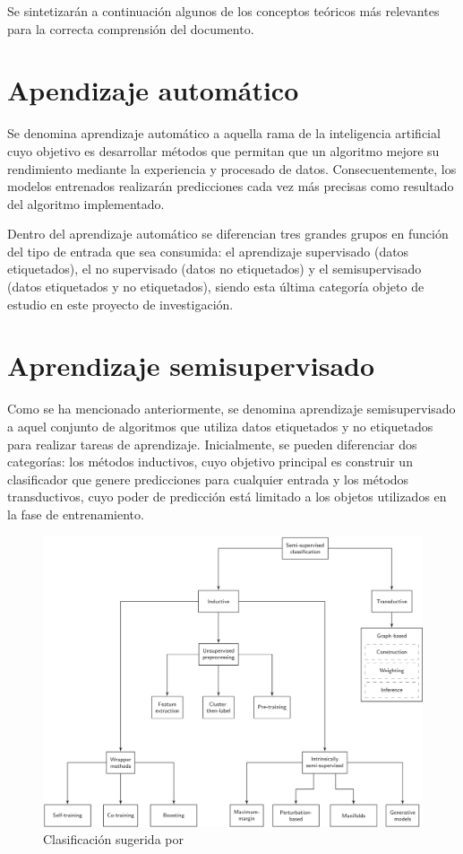 
Se sintetizarán a continuación algunos de los conceptos teóricos más relevantes para la correcta comprensión del documento.

\section{Apendizaje automático}

Se denomina aprendizaje automático a aquella rama de la inteligencia artificial cuyo objetivo es desarrollar métodos que permitan que un algoritmo mejore su rendimiento mediante la experiencia y procesado de datos. Consecuentemente, los modelos entrenados realizarán predicciones cada vez más precisas como resultado del algoritmo implementado.

Dentro del aprendizaje automático se diferencian tres grandes grupos en función del tipo de entrada que sea consumida: el aprendizaje supervisado (datos etiquetados), el no supervisado (datos no etiquetados) y el semisupervisado (datos etiquetados y no etiquetados), siendo esta última categoría objeto de estudio en este proyecto de investigación. 

\section{Aprendizaje semisupervisado}

Como se ha mencionado anteriormente, se denomina aprendizaje semisupervisado a aquel conjunto de algoritmos que utiliza datos etiquetados y no etiquetados para realizar tareas de aprendizaje. Inicialmente, se pueden diferenciar dos categorías\cite{engelen2020surveyOnSemiSupervised}: los métodos inductivos, cuyo objetivo principal es construir un clasificador que genere predicciones para cualquier entrada y los métodos transductivos, cuyo poder de predicción está limitado a los objetos utilizados en la fase de entrenamiento.


\begin{figure}[h]
\caption{Clasificación sugerida por \cite{engelen2020surveyOnSemiSupervised}}
\centering
\includegraphics[width=\textwidth]{../img/memoria/esquemaHoos}
\end{figure}

